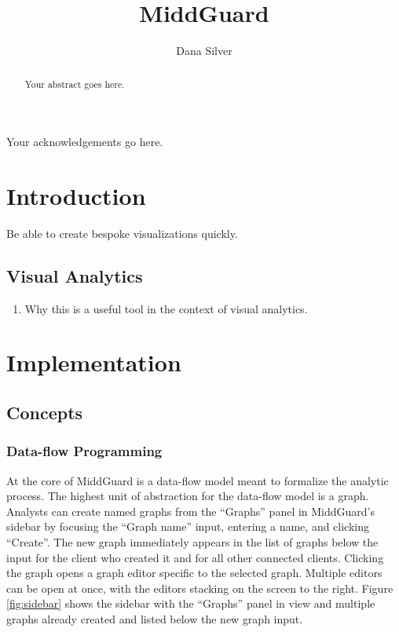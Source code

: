 \documentclass[midd]{thesis}
\title {MiddGuard}
\author {Dana Silver}
\begin{document}
\maketitle

\begin{abstract}
Your abstract goes here.
\end{abstract}

\begin{acknowledgements}
Your acknowledgements go here.
\end{acknowledgements}

\contentspage
\tablelistpage
\figurelistpage

\normalspacing \setcounter{page}{1} 

\chapter{Introduction}

Be able to create bespoke visualizations quickly.

\section{Visual Analytics}
\begin{enumerate}
  \item Why this is a useful tool in the context of visual analytics.
\end{enumerate}



\chapter{Implementation}

\section{Concepts}

\subsection{Data-flow Programming}

At the core of MiddGuard is a data-flow model meant to formalize the analytic
process. The highest unit of abstraction for the data-flow model is a graph.
Analysts can create named graphs from the ``Graphs'' panel in MiddGuard's
sidebar by focusing the ``Graph name'' input, entering a name, and clicking
``Create''. The new graph immediately appears in the list of graphs below the
input for the client who created it and for all other connected clients.
Clicking the graph opens a graph editor specific to the selected graph. Multiple
editors can be open at once, with the editors stacking on the screen to the
right. Figure \ref{fig:sidebar} shows the sidebar with the ``Graphs'' panel in
view and multiple graphs already created and listed below the new graph input.
\end{document}
